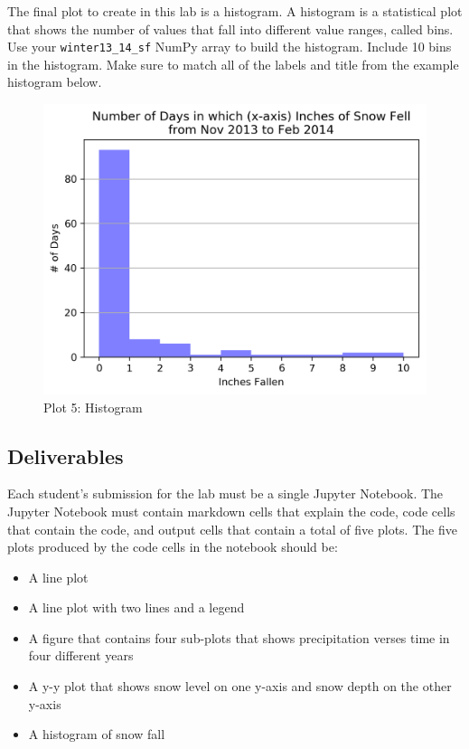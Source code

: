 \documentclass[11pt]{article}
\makeatletter
\def\maxwidth{\ifdim\Gin@nat@width>\linewidth\linewidth
    \else\Gin@nat@width\fi}
\let\Oldincludegraphics\includegraphics
\renewcommand{\includegraphics}[1]{\Oldincludegraphics[width=.8\maxwidth]{#1}}
\makeatother
\begin{document}
The final plot to create in this lab is a histogram. A histogram is a
statistical plot that shows the number of values that fall into
different value ranges, called bins. Use your \texttt{winter13\_14\_sf}
NumPy array to build the histogram. Include 10 bins in the histogram.
Make sure to match all of the labels and title from the example
histogram below.

\begin{figure}[h!]
\centering
\includegraphics{images/plot5.png}
\caption{Plot 5: Histogram}
\end{figure}

    \hypertarget{deliverables}{%
\subsection{Deliverables}\label{deliverables}}

Each student's submission for the lab must be a single Jupyter Notebook.
The Jupyter Notebook must contain markdown cells that explain the code,
code cells that contain the code, and output cells that contain a total
of five plots. The five plots produced by the code cells in the notebook
should be:

\begin{itemize}
\item
  A line plot
\item
  A line plot with two lines and a legend
\item
  A figure that contains four sub-plots that shows precipitation verses
  time in four different years
\item
  A y-y plot that shows snow level on one y-axis and snow depth on the
  other y-axis
\item
  A histogram of snow fall
\end{itemize}
\end{document}
